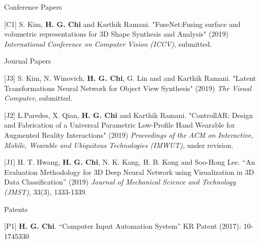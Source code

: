 


\begin{cventries}

\cvpub
{Conference Papers} %
{ %
\begin{cvitems}
\item {[C1] S. Kim, \textbf{H. G. Chi} and Karthik Ramani. "FuseNet:Fusing surface and volumetric representations for 3D Shape Synthesis and Analysis" (2019) \textit{International Conference on Computer Vision (ICCV)}, submitted.}
\end{cvitems}
}


\cvpub
{Journal Papers} %
{ %
\begin{cvitems}
\item {[J3] S. Kim, N. Winovich, \textbf{H. G. Chi}, G. Lin and and Karthik Ramani. "Latent Transformations Neural Network for Object View Synthesis" (2019) \textit{The Visual Computer}, submitted.}
\item {[J2] L.Paredes, X. Qian, \textbf{H. G. Chi} and Karthik Ramani. "ControllAR: Design and Fabrication of a Universal Parametric Low-Profile Hand Wearable for Augmented Reality Interactions" (2019) \textit{Proceedings of the ACM on Interactive, Mobile, Wearable and Ubiquitous Technologies (IMWUT)}, under revision.}
\item {[J1] H. T. Hwang, \textbf{H. G. Chi}, N. K. Kang, H. B. Kong and Soo-Hong Lee. “An Evaluation Methodology for 3D Deep Neural Network using Visualization in 3D Data Classification” (2019) \textit{Journal of Mechanical Science and Technology (JMST)}, 33(3), 1333-1339.}
\end{cvitems}
}

\cvpub
{Patents} %
{ %
\begin{cvitems}
\item {[P1] \textbf{H. G. Chi}.  “Computer Input Automation System” KR Patent (2017): 10-1745330}
\end{cvitems}
}



\end{cventries}